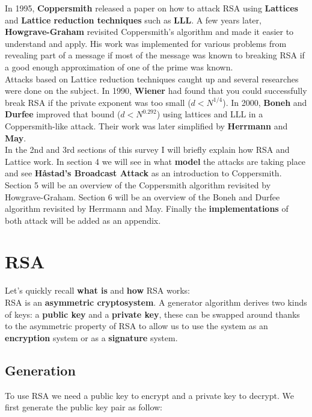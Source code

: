 \documentclass[a4paper,11pt]{article}
\begin{document}
In 1995, \textbf{Coppersmith} released a paper on how to attack RSA using \textbf{Lattices} and \textbf{Lattice reduction techniques} such as \textbf{LLL}. A few years later, \textbf{Howgrave-Graham} revisited Coppersmith's algorithm and made it easier to understand and apply. His work was implemented for various problems from revealing part of a message if most of the message was known to breaking RSA if a good enough approximation of one of the prime was known.\\
Attacks based on Lattice reduction techniques caught up and several researches were done on the subject. In 1990, \textbf{Wiener} had found that you could successfully break RSA if the private exponent was too small ($d<N^{1/4}$). In 2000, \textbf{Boneh} and \textbf{Durfee} improved that bound ($d<N^{0.292}$) using lattices and LLL in a Coppersmith-like attack. Their work was later simplified by \textbf{Herrmann} and \textbf{May}.\\
In the 2nd and 3rd sections of this survey I will briefly explain how RSA and Lattice work. In section 4 we will see in what \textbf{model} the attacks are taking place and see \textbf{Håstad's Broadcast Attack} as an introduction to Coppersmith. Section 5 will be an overview of the Coppersmith algorithm revisited by Howgrave-Graham. Section 6 will be an overview of the Boneh and Durfee algorithm revisited by Herrmann and May. Finally the \textbf{implementations} of both attack will be added as an appendix.

\section{RSA}\label{rsa}

Let's quickly recall \textbf{what is} and \textbf{how} RSA works:\\
RSA is an \textbf{asymmetric cryptosystem}. A generator algorithm derives two kinds of keys: a \textbf{public key} and a \textbf{private key}, these can be swapped around thanks to the asymmetric property of RSA to allow us to use the system as an \textbf{encryption} system or as a \textbf{signature} system.\\

\subsection{Generation}

To use RSA we need a public key to encrypt and a private key to decrypt. We first generate the public key pair as follow:\\
\end{document}
